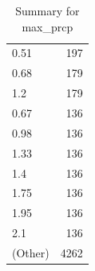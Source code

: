 \begin{table}[ht]
\begin{tabular}{lr}
  0.51 & 197 \\ 
  0.68 & 179 \\ 
  1.2 & 179 \\ 
  0.67 & 136 \\ 
  0.98 & 136 \\ 
  1.33 & 136 \\ 
  1.4 & 136 \\ 
  1.75 & 136 \\ 
  1.95 & 136 \\ 
  2.1 & 136 \\ 
  (Other) & 4262 \\ 
   \hline
\end{tabular}
\caption{Summary for max_prcp} 
\label{tab: max_prcp}
\end{table}
